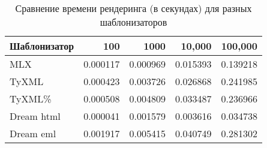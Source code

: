 

\begin{table}[h]
    \centering
    \caption{Сравнение времени рендеринга (в секундах) для разных шаблонизаторов}
    \label{tab:rendering-times}
    \begin{tabular}{lrrrr}
        \toprule
        \textbf{Шаблонизатор} & \textbf{100} & \textbf{1000} & \textbf{10,000} & \textbf{100,000} \\
        \midrule
        MLX                   & 0.000117     & 0.000969      & 0.015393        & 0.139218         \\
        TyXML                 & 0.000423     & 0.003726      & 0.026868        & 0.241985         \\
        TyXML\%               & 0.000508     & 0.004809      & 0.033487        & 0.236966         \\
        Dream html            & 0.000041     & 0.001579      & 0.003616        & 0.034738         \\
        Dream eml             & 0.001917     & 0.005415      & 0.040749        & 0.281302         \\
        \bottomrule
    \end{tabular}
\end{table}
